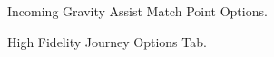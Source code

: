 \documentclass[11pt]{article}
\begin{document}
\begin{figure}[H]
	\centering
	\caption{\label{fig:gravity_assist_options}Incoming Gravity Assist Match Point Options.}
\end{figure}

\begin{figure}[H]
	\centering
	\caption{\label{fig:high_fidelity_journey_options}High Fidelity Journey Options Tab.}
\end{figure}
\end{document}
